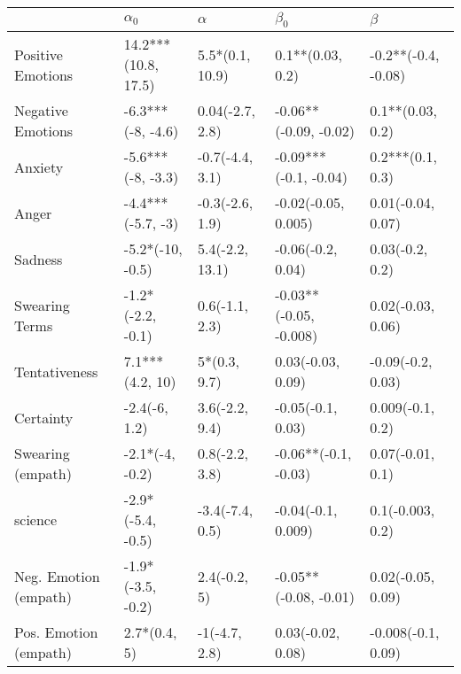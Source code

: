 \begin{tabular}{lllll}
\toprule
{} &           $\alpha_0$ &         $\alpha$ &               $\beta_0$ &              $\beta$ \\
\midrule
Positive Emotions     &  14.2***(10.8, 17.5) &  5.5*(0.1, 10.9) &        0.1**(0.03, 0.2) &  -0.2**(-0.4, -0.08) \\
Negative Emotions     &    -6.3***(-8, -4.6) &  0.04(-2.7, 2.8) &   -0.06**(-0.09, -0.02) &     0.1**(0.03, 0.2) \\
Anxiety               &    -5.6***(-8, -3.3) &  -0.7(-4.4, 3.1) &   -0.09***(-0.1, -0.04) &     0.2***(0.1, 0.3) \\
Anger                 &    -4.4***(-5.7, -3) &  -0.3(-2.6, 1.9) &     -0.02(-0.05, 0.005) &    0.01(-0.04, 0.07) \\
Sadness               &     -5.2*(-10, -0.5) &  5.4(-2.2, 13.1) &       -0.06(-0.2, 0.04) &      0.03(-0.2, 0.2) \\
Swearing Terms        &    -1.2*(-2.2, -0.1) &   0.6(-1.1, 2.3) &  -0.03**(-0.05, -0.008) &    0.02(-0.03, 0.06) \\
Tentativeness         &      7.1***(4.2, 10) &     5*(0.3, 9.7) &       0.03(-0.03, 0.09) &    -0.09(-0.2, 0.03) \\
Certainty             &        -2.4(-6, 1.2) &   3.6(-2.2, 9.4) &       -0.05(-0.1, 0.03) &     0.009(-0.1, 0.2) \\
Swearing (empath)     &      -2.1*(-4, -0.2) &   0.8(-2.2, 3.8) &    -0.06**(-0.1, -0.03) &     0.07(-0.01, 0.1) \\
science               &    -2.9*(-5.4, -0.5) &  -3.4(-7.4, 0.5) &      -0.04(-0.1, 0.009) &     0.1(-0.003, 0.2) \\
Neg. Emotion (empath) &    -1.9*(-3.5, -0.2) &     2.4(-0.2, 5) &   -0.05**(-0.08, -0.01) &    0.02(-0.05, 0.09) \\
Pos. Emotion (empath) &         2.7*(0.4, 5) &    -1(-4.7, 2.8) &       0.03(-0.02, 0.08) &   -0.008(-0.1, 0.09) \\
\bottomrule
\end{tabular}
